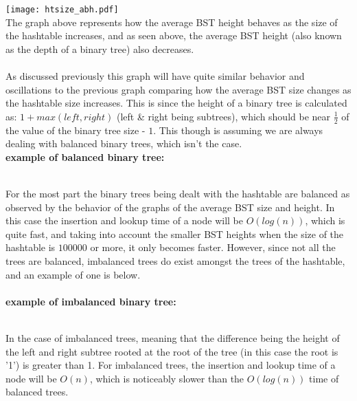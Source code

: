\documentclass[
	12pt, %
]{fphw}
\begin{document}
\texttt{[image: htsize\_abh.pdf]}
\\
The graph above represents how the average BST height behaves as the size of the hashtable increases, and as seen above, the average BST height (also known as the depth of a binary tree) also decreases. \\
\\
As discussed previously this graph will have quite similar behavior and oscillations to the previous graph comparing how the average BST size changes as the hashtable size increases. This is since the height of a binary tree is calculated as: $1 + max(left,right)$ (left \& right being subtrees), which should be near $\frac{1}{2}$ of the value of the binary tree size - $1$. This though is assuming we are always dealing with balanced binary trees, which isn't the case. \\
\textbf{example of balanced binary tree:} \\
\\
For the most part the binary trees being dealt with the hashtable are balanced as observed by the behavior of the graphs of the average BST size and height. In this case the insertion and lookup time of a node will be $O(log(n))$, which is quite fast, and taking into account the smaller BST heights when the size of the hashtable is $100000$ or more, it only becomes faster. However, since not all the trees are balanced, imbalanced trees do exist amongst the trees of the hashtable, and an example of one is below. \\
\\
\textbf{example of imbalanced binary tree:} \\
\\
In the case of imbalanced trees, meaning that the difference being the height of the left and right subtree rooted at the root of the tree (in this case the root is '1') is greater than 1. For imbalanced trees, the insertion and lookup time of a node will be $O(n)$, which is noticeably slower than the $O(log(n))$ time of balanced trees.
\end{document}

